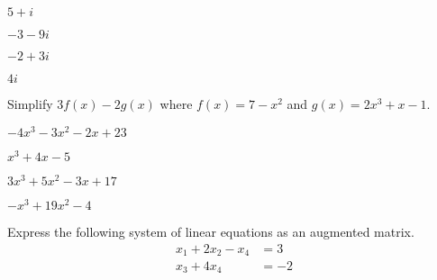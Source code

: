 \documentclass{article}
\begin{document}
\begin{readinessAssuranceTest}
\begin{multicols}{4}
\begin{readinessAssuranceTestChoices}
\item \(5+i\)
\item \(-3-9i\)
\item \(-2+3i\) %
\item \(4i\)
\end{readinessAssuranceTestChoices}
\end{multicols}

\item Simplify \(3f(x)-2g(x)\) where
      \(f(x)=7-x^2\) and
      \(g(x)=2x^3+x-1\).

\begin{multicols}{4}
\begin{readinessAssuranceTestChoices}
\item \(-4x^3-3x^2-2x+23\) %
\item \(x^3+4x-5\)
\item \(3x^3+5x^2-3x+17\)
\item \(-x^3+19x^2-4\)
\end{readinessAssuranceTestChoices}
\end{multicols}

\item Express the following system of linear equations as an augmented matrix.
\begin{align*}
  x_1 + 2x_2      -  x_4 &= 3 \\
             x_3 + 4x_4 &= -2
\end{align*}


\end{readinessAssuranceTest}
\end{document}
